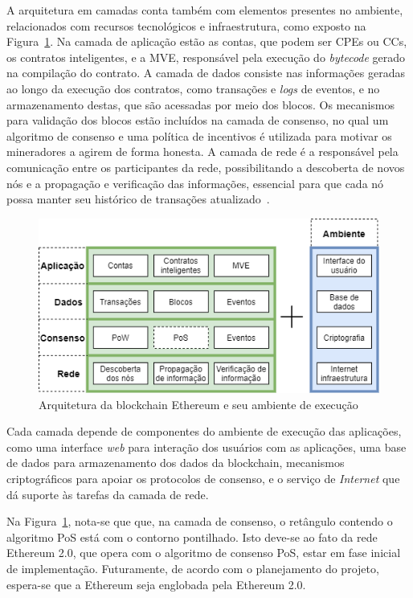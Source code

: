 A arquitetura em camadas conta também com elementos presentes no ambiente, relacionados com recursos tecnológicos e infraestrutura, como exposto na Figura~\ref{fig:eth-arquitetura}. Na camada de aplicação estão as contas, que podem ser CPEs ou CCs, os contratos inteligentes, e a MVE, responsável pela execução do \textit{bytecode} gerado na compilação do contrato. A camada de dados consiste nas informações geradas ao longo da execução dos contratos, como transações e \textit{logs} de eventos, e no armazenamento destas, que são acessadas por meio dos blocos. Os mecanismos para validação dos blocos estão incluídos na camada de consenso, no qual um algoritmo de consenso e uma política de incentivos é utilizada para motivar os mineradores a agirem de forma honesta. A camada de rede é a responsável pela comunicação entre os participantes da rede, possibilitando a descoberta de novos nós e a propagação e verificação das informações, essencial para que cada nó possa manter seu histórico de transações atualizado~\cite{chen2020survey-ethereum-acm}.    

\begin{figure}[htb]
 \caption{Arquitetura da blockchain Ethereum e seu ambiente de execução}
 \label{fig:eth-arquitetura}
 \centering
 \includegraphics[scale=0.5]{figuras/ethereum_arquitetura.png}
\end{figure}

Cada camada depende de componentes do ambiente de execução das aplicações, como uma interface \textit{web} para interação dos usuários com as aplicações, uma base de dados para armazenamento dos dados da blockchain, mecanismos criptográficos para apoiar os protocolos de consenso, e o serviço de \textit{Internet} que dá suporte às tarefas da camada de rede.

Na Figura~\ref{fig:eth-arquitetura}, nota-se que que, na camada de consenso, o retângulo contendo o algoritmo PoS está com o contorno pontilhado. Isto deve-se ao fato da rede Ethereum 2.0, que opera com o algoritmo de consenso PoS, estar em fase inicial de implementação. Futuramente, de acordo com o planejamento do projeto, espera-se que a Ethereum seja englobada pela Ethereum 2.0. 

